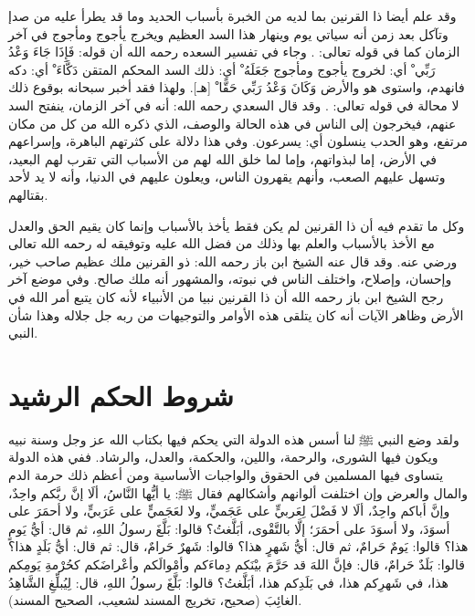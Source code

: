 وقد علم أيضا ذا القرنين بما لديه من الخبرة بأسباب الحديد وما قد يطرأ عليه من صدإ وتآكل بعد زمن أنه سياتي يوم وينهار هذا السد العظيم ويخرج يأجوج ومأجوج في آخر الزمان كما في قوله تعالى: 
\quranayah*[18][98][6]{\footnotesize \surahname*[18]}. وجاء في تفسير السعده رحمه الله أن قوله: { فَإِذَا جَاءَ وَعْدُ رَبِّي ْ} أي: لخروج يأجوج ومأجوج { جَعَلَهُ ْ} أي: ذلك السد المحكم المتقن { دَكَّاءَ ْ} أي: دكه فانهدم، واستوى هو والأرض { وَكَانَ وَعْدُ رَبِّي حَقًّا ْ} [هـ]. ولهذا فقد أخبر سبحانه بوقوع ذلك لا محالة في قوله تعالى: 
\quranayah*[21][96]{\footnotesize \surahname*[21]}. وقد قال السعدي رحمه الله: أنه في آخر الزمان، ينفتح السد عنهم، فيخرجون إلى الناس في هذه الحالة والوصف، الذي ذكره الله من كل من مكان مرتفع، وهو الحدب ينسلون أي: يسرعون. وفي هذا دلالة على كثرتهم الباهرة، وإسراعهم في الأرض، إما لبذواتهم، وإما لما خلق الله لهم من الأسباب التي تقرب لهم البعيد، وتسهل عليهم الصعب، وأنهم يقهرون الناس، ويعلون عليهم في الدنيا، وأنه لا يد لأحد بقتالهم. 

وكل ما تقدم فيه أن ذا القرنين لم يكن فقط يأخذ بالأسباب وإنما كان يقيم الحق والعدل مع الأخذ بالأسباب والعلم بها وذلك من فضل الله عليه وتوفيقه له رحمه الله تعالى ورضي عنه. وقد قال عنه الشيخ ابن باز رحمه الله: ذو القرنين ملك عظيم صاحب خير، وإحسان، وإصلاح، واختلف الناس في نبوته، والمشهور أنه ملك صالح. وفي موضع آخر رجح الشيخ ابن باز رحمه الله أن ذا القرنين نبيا من الأنبياء لأنه كان يتبع أمر الله في الأرض وظاهر الآيات أنه كان يتلقى هذه الأوامر والتوجيهات من ربه جل جلاله وهذا شأن النبي.

\section{شروط الحكم الرشيد}

ولقد وضع النبي ﷺ لنا أسس هذه الدولة التي يحكم فيها بكتاب الله عز وجل وسنة نبيه ويكون فيها الشورى، والرحمة، واللين، والحكمة، والعدل، والرشاد. ففي هذه الدولة  يتساوى فيها المسلمين في الحقوق والواجبات الأساسية ومن أعظم ذلك حرمة الدم والمال والعرض وإن اختلفت ألوانهم وأشكالهم فقال ﷺ: يا أيُّها النَّاسُ، ألَا إنَّ ربَّكم واحِدٌ، وإنَّ أباكم واحِدٌ، ألَا لا فَضْلَ لِعَربيٍّ على عَجَميٍّ، ولا لعَجَميٍّ على عَرَبيٍّ، ولا أحمَرَ على أسوَدَ، ولا أسوَدَ على أحمَرَ؛ إلَّا بالتَّقْوى، أبَلَّغتُ؟ قالوا: بَلَّغَ رسولُ اللهِ، ثم قال: أيُّ يَومٍ هذا؟ قالوا: يَومٌ حَرامٌ، ثم قال: أيُّ شَهرٍ هذا؟ قالوا: شَهرٌ حَرامٌ، قال: ثم قال: أيُّ بَلَدٍ هذا؟ قالوا: بَلَدٌ حَرامٌ، قال: فإنَّ اللهَ قد حَرَّمَ بيْنَكم دِماءَكم وأمْوالَكم وأعْراضَكم كحُرْمةِ يَومِكم هذا، في شَهرِكم هذا، في بَلَدِكم هذا، أبَلَّغتُ؟ قالوا: بَلَّغَ رسولُ اللهِ، قال: لِيُبلِّغِ الشَّاهِدُ الغائِبَ {\footnotesize (صحيح، تخريج المسند لشعيب، الصحيح المسند)}.

